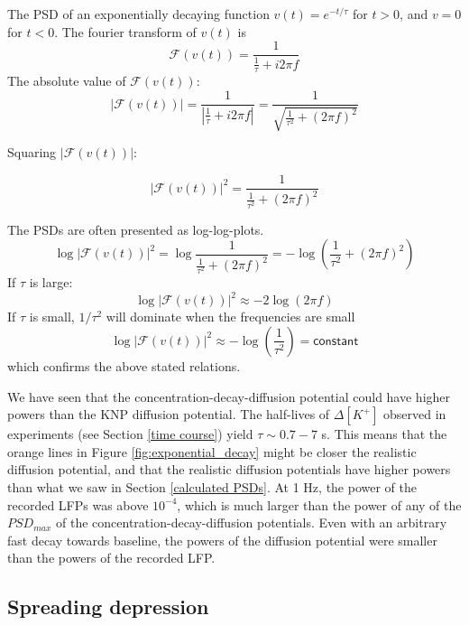 \documentclass{article}
\begin{document}
The PSD of an exponentially decaying function $v(t) = e^{-t/\tau}$ for $t>0$, and $v=0$ for $t<0$.
The fourier transform of $v(t)$ is
$$
\mathcal{F}(v(t))= \frac{1}{\frac{1}{\tau} +i2\pi f}
$$
The absolute value of $\mathcal{F}(v(t))$:
$$
|\mathcal{F}(v(t))| = \frac{1}{|\frac{1}{\tau} +i2\pi f|}=\frac{1}{\sqrt{\frac{1}{\tau^2} +(2\pi f)^2}}
$$

Squaring $|\mathcal{F}(v(t))|$:

$$
|\mathcal{F}(v(t))|^2= \frac{1}{\frac{1}{\tau^2} +(2\pi f)^2}
$$

The PSDs are often presented as log-log-plots.
$$
\log |\mathcal{F}(v(t))|^2= \log \frac{1}{\frac{1}{\tau^2} +(2\pi f)^2}=- \log(\frac{1}{\tau^2} +(2\pi f)^2)
$$
If $\tau$ is large:
$$
\log |\mathcal{F}(v(t))|^2 \approx -2\log(2\pi f)
$$
If $\tau$ is small, $1/\tau^2$ will dominate when the frequencies are small
$$
\log |\mathcal{F}(v(t))|^2 \approx -\log(\frac{1}{\tau^2})=\mathsf{constant}
$$
which confirms the above stated relations. 

We have seen that the concentration-decay-diffusion potential could have higher powers than the KNP diffusion potential. The half-lives of $\Delta [K^+]$ observed in experiments (see Section \ref{time course}) yield $\tau \sim 0.7-7$ s. This means that the orange lines in Figure \ref{fig:exponential_decay} might be closer the realistic diffusion potential, and that the realistic diffusion potentials have higher powers than what we saw in Section \ref{calculated PSDs}.  At 1 Hz, the power of the recorded LFPs was above $10^{-4}$, which is much larger than the power of any of the $PSD_{max}$ of the concentration-decay-diffusion potentials. Even with an arbitrary fast decay towards baseline, the powers of the diffusion potential were smaller than the powers of the recorded LFP.

\subsection{Spreading depression}\label{SD simulated}
\end{document}
